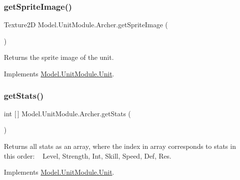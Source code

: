 \hypertarget{class_model_1_1_unit_module_1_1_archer_a2a400bdeef5aaaa34ffe6428ecaaf2c2}{}\label{class_model_1_1_unit_module_1_1_archer_a2a400bdeef5aaaa34ffe6428ecaaf2c2} 
\subsubsection{\texorpdfstring{get\+Sprite\+Image()}{getSpriteImage()}}
{\footnotesize\ttfamily Texture2D Model.\+Unit\+Module.\+Archer.\+get\+Sprite\+Image (\begin{DoxyParamCaption}{ }\end{DoxyParamCaption})\hspace{0.3cm}{\ttfamily [inline]}}

Returns the sprite image of the unit. 

Implements \hyperlink{interface_model_1_1_unit_module_1_1_unit_a797013e0463ea2e8c9ae8171f7d305f0}{Model.\+Unit\+Module.\+Unit}.

\hypertarget{class_model_1_1_unit_module_1_1_archer_a1b339759429e0a031aadf2b3e2505e66}{}\label{class_model_1_1_unit_module_1_1_archer_a1b339759429e0a031aadf2b3e2505e66} 
\subsubsection{\texorpdfstring{get\+Stats()}{getStats()}}
{\footnotesize\ttfamily int \mbox{[}$\,$\mbox{]} Model.\+Unit\+Module.\+Archer.\+get\+Stats (\begin{DoxyParamCaption}{ }\end{DoxyParamCaption})\hspace{0.3cm}{\ttfamily [inline]}}

Returns all stats as an array, where the index in array corresponds to stats in this order\+: ~\newline
 Level, Strength, Int, Skill, Speed, Def, Res. 

Implements \hyperlink{interface_model_1_1_unit_module_1_1_unit_a32890c6e0bf19a58dde71cc4240576a8}{Model.\+Unit\+Module.\+Unit}.

\hypertarget{class_model_1_1_unit_module_1_1_archer_ae3a17a1d3f60e9e35e0d25c45158a8eb}{}\label{class_model_1_1_unit_module_1_1_archer_ae3a17a1d3f60e9e35e0d25c45158a8eb} 
